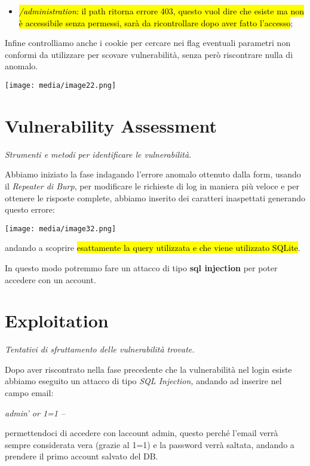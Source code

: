 \begin{itemize}
\item
  \hl{\emph{/administration}: il path ritorna errore 403, questo vuol
  dire che esiste ma non è accessibile senza permessi, sarà da
  ricontrollare dopo aver fatto l'accesso};
\end{itemize}

Infine controlliamo anche i cookie per cercare nei flag eventuali
parametri non conformi da utilizzare per scovare vulnerabilità, senza
però riscontrare nulla di anomalo.

\texttt{[image: media/image22.png]}

\section{Vulnerability Assessment}\label{vulnerability-assessment}

\emph{Strumenti e metodi per identificare le vulnerabilità.}

Abbiamo iniziato la fase indagando l'errore anomalo ottenuto dalla form,
usando il \emph{Repeater di Burp}, per modificare le richieste di log in
maniera più veloce e per ottenere le risposte complete, abbiamo inserito
dei caratteri inaspettati generando questo errore:

\texttt{[image: media/image32.png]}

andando a scoprire \hl{esattamente la query utilizzata e che viene
utilizzato SQLite}.

In questo modo potremmo fare un attacco di tipo \textbf{sql injection}
per poter accedere con un account.

\section{Exploitation}\label{exploitation}

\emph{Tentativi di sfruttamento delle vulnerabilità trovate.}

Dopo aver riscontrato nella fase precedente che la vulnerabilità nel
login esiste abbiamo eseguito un attacco di tipo \emph{SQL Injection,}
andando ad inserire nel campo email:

\emph{admin' or 1=1 --}

permettendoci di accedere con l\textquotesingle account admin, questo
perché l'email verrà sempre considerata vera (grazie al 1=1) e la
password verrà saltata, andando a prendere il primo account salvato del
DB.

